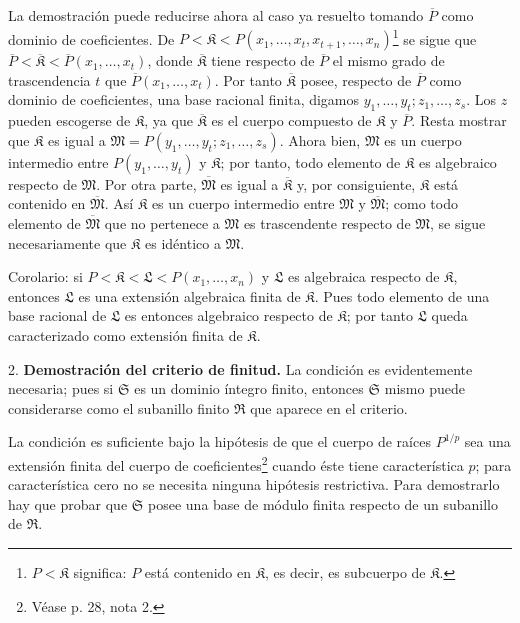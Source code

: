 \documentclass[11pt]{article}
\begin{document}
La demostración puede reducirse ahora al caso ya resuelto tomando $\overline P$ como dominio de coeficientes. De $P<\mathfrak K<P(x_1,\ldots,x_t,x_{t+1},\ldots,x_n)$\footnote{$P<\mathfrak K$ significa: $P$ está contenido en $\mathfrak K$, es decir, es subcuerpo de $\mathfrak K$.} se sigue que $\overline P<\overline{\mathfrak K}<\overline P(x_1,\ldots,x_t)$, donde $\overline{\mathfrak K}$ tiene respecto de $\overline P$ el mismo grado de trascendencia $t$ que $\overline P(x_1,\ldots,x_t)$. Por tanto $\overline{\mathfrak K}$ posee, respecto de $\overline P$ como dominio de coeficientes, una base racional finita, digamos $y_1,\ldots,y_t; z_1,\ldots,z_s$. Los $z$ pueden escogerse de $\mathfrak K$, ya que $\overline{\mathfrak K}$ es el cuerpo compuesto de $\mathfrak K$ y $\overline P$. Resta mostrar que $\mathfrak K$ es igual a $\mathfrak M=P(y_1,\ldots,y_t;z_1,\ldots,z_s)$. Ahora bien, $\mathfrak M$ es un cuerpo intermedio entre $P(y_1,\ldots,y_t)$ y $\mathfrak K$; por tanto, todo elemento de $\mathfrak K$ es algebraico respecto de $\mathfrak M$. Por otra parte, $\overline{\mathfrak M}$ es igual a $\overline{\mathfrak K}$ y, por consiguiente, $\mathfrak K$ está contenido en $\overline{\mathfrak M}$. Así $\mathfrak K$ es un cuerpo intermedio entre $\mathfrak M$ y $\overline{\mathfrak M}$; como todo elemento de $\overline{\mathfrak M}$ que no pertenece a $\mathfrak M$ es trascendente respecto de $\mathfrak M$, se sigue necesariamente que $\mathfrak K$ es idéntico a $\mathfrak M$.

Corolario: si $P<\mathfrak K<\mathfrak L<P(x_1,\ldots,x_n)$ y $\mathfrak L$ es algebraica respecto de $\mathfrak K$, entonces $\mathfrak L$ es una extensión algebraica finita de $\mathfrak K$. Pues todo elemento de una base racional de $\mathfrak L$ es entonces algebraico respecto de $\mathfrak K$; por tanto $\mathfrak L$ queda caracterizado como extensión finita de $\mathfrak K$.

2. \textbf{Demostración del criterio de finitud.} La condición es evidentemente necesaria; pues si $\mathfrak S$ es un dominio íntegro finito, entonces $\mathfrak S$ mismo puede considerarse como el subanillo finito $\mathfrak R$ que aparece en el criterio.

La condición es suficiente bajo la hipótesis de que el cuerpo de raíces $P^{1/p}$ sea una extensión finita del cuerpo de coeficientes\footnote{Véase p. 28, nota 2.} cuando éste tiene característica $p$; para característica cero no se necesita ninguna hipótesis restrictiva. Para demostrarlo hay que probar que $\mathfrak S$ posee una base de módulo finita respecto de un subanillo de $\mathfrak R$.
\end{document}
